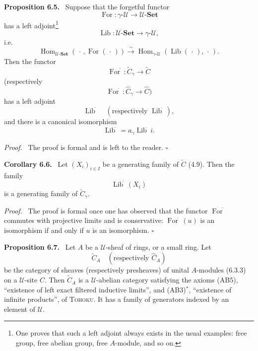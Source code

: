\documentclass[11pt]{article}
\newcommand{\U}{\mathcal{U}}
\newcommand{\Set}{\mathbf{Set}}
\newcommand{\Hom}{\operatorname{Hom}}
\newcommand{\qedtext}{\hfill\(\square\)}
\newcommand{\blank}{\,\cdot\,}
\newenvironment{statement}[1]{\par\medskip\noindent\textbf{#1.}\ }{\par\medskip}
\newenvironment{prooftext}{\par\noindent\emph{Proof.}\ }{\par\medskip}
\begin{document}
\begin{statement}{Proposition 6.5}
Suppose that the forgetful functor
\[
\operatorname{For}:\gamma\text{-}\U\to \U\text{-}\Set
\]
has a left adjoint\footnote{One proves that such a left adjoint always exists in the usual examples: free group, free abelian group, free \(A\)-module, and so on.}
\[
\operatorname{Lib}:\U\text{-}\Set\to\gamma\text{-}\U,
\]
i.e.
\[
\Hom_{\U\text{-}\Set}(\blank,\operatorname{For}(\blank))
\xrightarrow{\sim}
\Hom_{\gamma\text{-}\U}(\operatorname{Lib}(\blank),\blank).
\]
Then the functor
\[
\operatorname{For}^{\widetilde{\phantom{,}}}:\widetilde C_{\gamma}\to \widetilde C
\]
(respectively
\[
\operatorname{For}^{\widehat{\phantom{,}}}:\widehat C_{\gamma}\to \widehat C)
\]
has a left adjoint
\[
\operatorname{Lib}^{\widetilde{\phantom{,}}}
\quad(\text{respectively } \operatorname{Lib}^{\widehat{\phantom{,}}}),
\]
and there is a canonical isomorphism
\[
\operatorname{Lib}^{\widetilde{\phantom{,}}}
=
a_{\gamma}\operatorname{Lib}^{\widehat{\phantom{,}}}i.
\]
\end{statement}

\begin{prooftext}
The proof is formal and is left to the reader. \qedtext
\end{prooftext}

\begin{statement}{Corollary 6.6}
Let \((X_i)_{i\in I}\) be a generating family of \(\widetilde C\) (4.9). Then the family
\[
\operatorname{Lib}^{\widetilde{\phantom{,}}}(X_i)
\]
is a generating family of \(\widetilde C_{\gamma}\).
\end{statement}

\begin{prooftext}
The proof is formal once one has observed that the functor \(\operatorname{For}^{\widetilde{\phantom{,}}}\) commutes with projective limits and is conservative: \(\operatorname{For}^{\widetilde{\phantom{,}}}(u)\) is an isomorphism if and only if \(u\) is an isomorphism. \qedtext
\end{prooftext}

\begin{statement}{Proposition 6.7}
Let \(A\) be a \(\U\)-sheaf of rings, or a small ring. Let
\[
\widetilde C_A\quad(\text{respectively } \widehat C_A)
\]
be the category of sheaves (respectively presheaves) of unital \(A\)-modules (6.3.3) on a \(\U\)-site \(C\). Then \(\widetilde C_A\) is a \(\U\)-abelian category satisfying the axioms (AB5), ``existence of left exact filtered inductive limits'', and (AB3)\({}^{\ast}\), ``existence of infinite products'', of \textsc{Tohoku}. It has a family of generators indexed by an element of \(\U\).
\end{statement}
\end{document}
